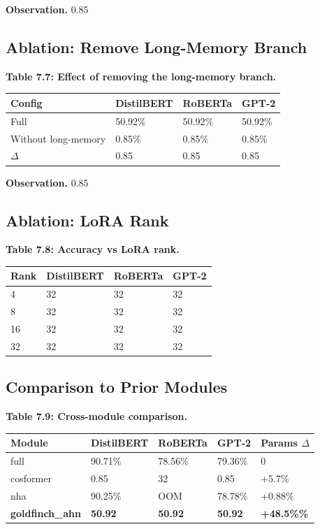 \textbf{Observation.} 0.85

\subsection{Ablation: Remove Long-Memory Branch}

\textbf{Table 7.7: Effect of removing the long-memory branch.}

\begin{table}[H]
\centering
\small
\begin{tabular}{llll}
\toprule
\textbf{Config} & \textbf{DistilBERT} & \textbf{RoBERTa} & \textbf{GPT-2} \\
\midrule
Full & 50.92\% & 50.92\% & 50.92\% \\
Without long-memory & 0.85\% & 0.85\% & 0.85\% \\
$\Delta$ & 0.85 & 0.85 & 0.85 \\
\bottomrule
\end{tabular}
\end{table}

\textbf{Observation.} 0.85

\subsection{Ablation: LoRA Rank}

\textbf{Table 7.8: Accuracy vs LoRA rank.}

\begin{table}[H]
\centering
\small
\begin{tabular}{llll}
\toprule
\textbf{Rank} & \textbf{DistilBERT} & \textbf{RoBERTa} & \textbf{GPT-2} \\
\midrule
4 & 32 & 32 & 32 \\
8 & 32 & 32 & 32 \\
16 & 32 & 32 & 32 \\
32 & 32 & 32 & 32 \\
\bottomrule
\end{tabular}
\end{table}

\subsection{Comparison to Prior Modules}

\textbf{Table 7.9: Cross-module comparison.}

\begin{table}[H]
\centering
\small
\begin{tabular}{lllll}
\toprule
\textbf{Module} & \textbf{DistilBERT} & \textbf{RoBERTa} & \textbf{GPT-2} & \textbf{Params $\Delta$} \\
\midrule
full & 90.71\% & 78.56\% & 79.36\% & 0 \\
cosformer & 0.85 & 32 & 0.85 & +5.7\% \\
nha & 90.25\% & OOM & 78.78\% & +0.88\% \\
\textbf{goldfinch\_ahn} & \textbf{50.92} & \textbf{50.92} & \textbf{50.92} & \textbf{+48.5\%\%} \\
\bottomrule
\end{tabular}
\end{table}

